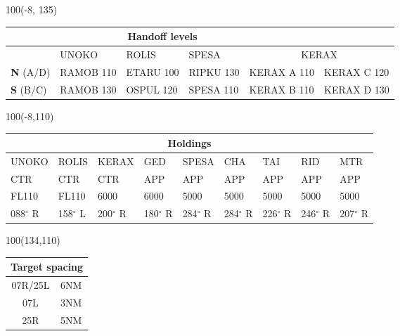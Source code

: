 \documentclass[10pt,landscape,a4paper]{article}
\begin{document}
\begin{textblock}{100}(-8, 135)
\begin{table}[]
\begin{tabular}{|l|l|l|l||l|l|}
\multicolumn{5}{c}{\textbf{Handoff levels}}              \\ \hline
           & UNOKO     & ROLIS     & SPESA     & \multicolumn{2}{c|}{KERAX}     \\ \hline
\textbf{N} (A/D) & RAMOB 110 & ETARU 100 & RIPKU 130 & KERAX A 110 & KERAX C 120\\
\textbf{S} (B/C) & RAMOB 130 & OSPUL 120 & SPESA 110 & KERAX B 110 & KERAX D 130\\ \hline
\end{tabular}
\end{table}
\end{textblock}

\begin{textblock}{100}(-8,110)
\begin{table}[]
\begin{tabular}{|l|l|l|l|l|l|l|l|l|}

\multicolumn{9}{c}{\textbf{Holdings}}                                        \\ \hline
UNOKO  & ROLIS  & KERAX  & GED    & SPESA  & CHA    & TAI    & RID    & MTR    \\ \hline
CTR    & CTR    & CTR    & APP    & APP    & APP    & APP    & APP    & APP    \\
FL110  & FL110  & 6000   & 6000   & 5000   & 5000   & 5000   & 5000   & 5000   \\
088$^\circ$ R & 158$^\circ$ L & 200$^\circ$ R & 180$^\circ$ R & 284$^\circ$ R & 284$^\circ$ R & 226$^\circ$ R & 246$^\circ$ R & 207$^\circ$ R \\ \hline
\end{tabular}
\end{table}
\end{textblock}

\begin{textblock}{100}(134,110)
\begin{table}[]
\begin{tabular}{|c|l|}
\multicolumn{2}{c}{\textbf{Target spacing}} \\ \hline
07R/25L  & 6NM  \\ \hline
07L      & 3NM  \\ \hline
25R      & 5NM  \\ \hline
\end{tabular}
\end{table}
\end{textblock}
\end{document}

